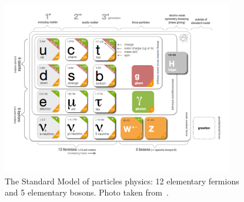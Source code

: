 \begin{figure}[!htb]
    \centering
    \captionsetup{justification=justified}
    \includegraphics[width=0.9\textwidth]{pics/Intro/standard_model_cern.png}
    \caption{The Standard Model of particles physics: 12 elementary fermions and 5 elementary bosons.
             Photo taken from~\cite{SM_table_CERN}. }
    \label{fig:SM_table}
\end{figure}

